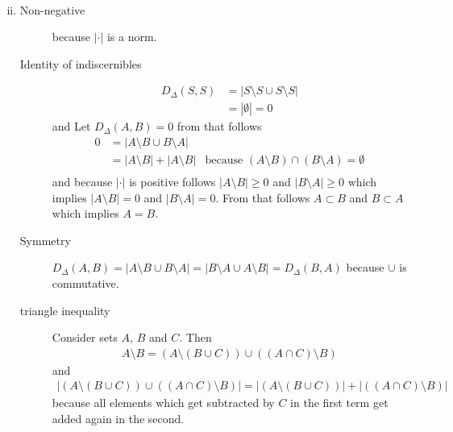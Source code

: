 \documentclass[10pt,a4paper,boxed]{hmcpset}
\begin{document}
\begin{solution}
\begin{enumerate}[(i)]
\begin{description}
\begin{align*}
							\end{align*}
					\end{description}
				\item 
					\begin{description}
						\item[Non-negative] because $|\cdot|$ is a norm.
						\item[Identity of indiscernibles] 
							\begin{align}
								D_\Delta(S,S) &= |S\setminus S \cup S\setminus S| \\
															&= | \emptyset	| = 0
							\end{align}
							and
							Let $D_\Delta(A,B) = 0$ from that follows
							\begin{align}
								 0 &= |A\setminus B \cup B \setminus A| \\
								 &= | A \setminus B| + | A \setminus B| & \text{because } (A \setminus B) \cap (B \setminus A) = \emptyset \label{leererschnitt} \\
							\end{align}
							and because $| \cdot |$ is positive follows $|A \setminus B| \geq 0$ and $|B\setminus A| \geq 0$ which implies
							$|A \setminus B| = 0$ and $|B\setminus A| = 0$. From that follows $A \subset B$ and $B \subset A$ which implies $A=B$.
						\item[Symmetry] $D_\Delta(A,B) = |A \setminus B \cup B \setminus A| = | B \setminus A \cup A \setminus B| = D_\Delta(B,A)$ because $\cup$ is commutative.
						\item[triangle inequality]
							Consider sets $A$, $B$ and $C$. Then
							\begin{align}
								A \setminus B = (A \setminus(B \cup C) )\cup ((A \cap C) \setminus B) \label{umformung}
							\end{align}
							and
							\begin{align}
								|(A \setminus(B \cup C) )\cup ((A \cap C) \setminus B)| = |(A \setminus(B \cup C) )| + | ((A \cap C) \setminus B)|  \label{gleichegroesze}
							\end{align}
							because all elements which get subtracted by $C$ in the first term get added again in the second.	


\end{description}
\end{enumerate}
\end{solution}
\end{document}

